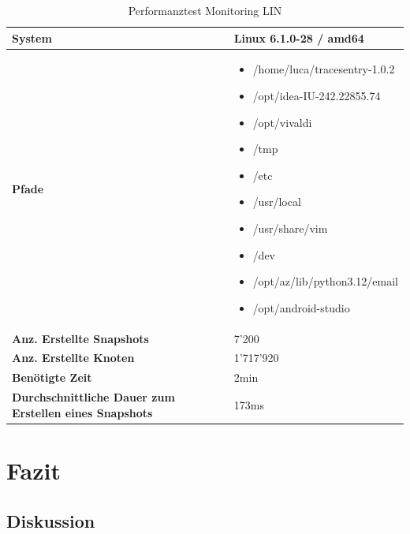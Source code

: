 \documentclass[a4paper,12pt]{report}
\begin{document}
    \begin{table}[h!]
        \centering
        \setlength{\leftmargini}{0.8cm}
        \begin{tabular}{|p{5cm}|p{10cm}|}
            \hline
            \textbf{System}                                               & Linux 6.1.0-28 / amd64 \\ \hline
            \textbf{Pfade} &
            \begin{itemize}
                \item /home/luca/tracesentry-1.0.2
                \item /opt/idea-IU-242.22855.74
                \item /opt/vivaldi
                \item /tmp
                \item /etc
                \item /usr/local
                \item /usr/share/vim
                \item /dev
                \item /opt/az/lib/python3.12/email
                \item /opt/android-studio
            \end{itemize}
            \\ \hline
            \textbf{Anz. Erstellte Snapshots}                             & 7'200                  \\ \hline
            \textbf{Anz. Erstellte Knoten}                                & 1'717'920              \\ \hline
            \textbf{Benötigte Zeit}                                       & 2min                   \\ \hline
            \textbf{Durchschnittliche Dauer zum Erstellen eines Snapshots} & 173ms                  \\ \hline
        \end{tabular}
        \caption{Performanztest Monitoring LIN}\label{tab:perf-monitoring-lin}
    \end{table}


    \chapter{Fazit}


    \section{Diskussion}
\end{document}
